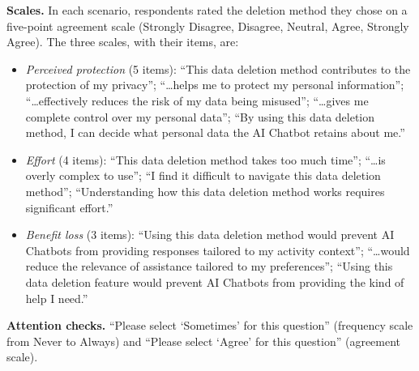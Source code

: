 \documentclass[conference,compsoc]{IEEEtran}
\begin{document}
\textbf{Scales.} In each scenario, respondents rated the deletion method
they chose on a five-point agreement scale (Strongly Disagree,
Disagree, Neutral, Agree, Strongly Agree). The three scales, with their
items, are:

\begin{itemize}[leftmargin=*,nosep]
\item \textit{Perceived protection} (5 items): ``This data deletion method
contributes to the protection of my privacy''; ``\ldots helps me to
protect my personal information''; ``\ldots effectively reduces the risk
of my data being misused''; ``\ldots gives me complete control over my
personal data''; ``By using this data deletion method, I can decide what
personal data the AI Chatbot retains about me.''
\item \textit{Effort} (4 items): ``This data deletion method takes too
much time''; ``\ldots is overly complex to use''; ``I find it difficult to
navigate this data deletion method''; ``Understanding how this data
deletion method works requires significant effort.''
\item \textit{Benefit loss} (3 items): ``Using this data deletion method
would prevent AI Chatbots from providing responses tailored to my
activity context''; ``\ldots would reduce the relevance of assistance
tailored to my preferences''; ``Using this data deletion feature would
prevent AI Chatbots from providing the kind of help I need.''
\end{itemize}

\textbf{Attention checks.} ``Please select `Sometimes' for this question''
(frequency scale from Never to Always) and ``Please select `Agree' for
this question'' (agreement scale).
\end{document}
